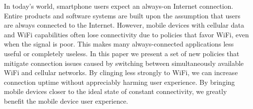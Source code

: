 
In today's world, smartphone users expect an always-on Internet connection. Entire products and software systems are built upon the assumption that users are always connected to the Internet. However, mobile devices with cellular data and WiFi capabilities often lose connectivity due to policies that favor WiFi, even when the signal is poor. This makes many always-connected applications less useful or completely useless. In this paper we present a set of new policies that mitigate connection issues caused by switching between simultaneously available WiFi and cellular networks. By clinging less strongly to WiFi, we can increase connection uptime without appreciably harming user experience. By bringing mobile devices closer to the ideal state of constant connectivity, we greatly benefit the mobile device user experience.

